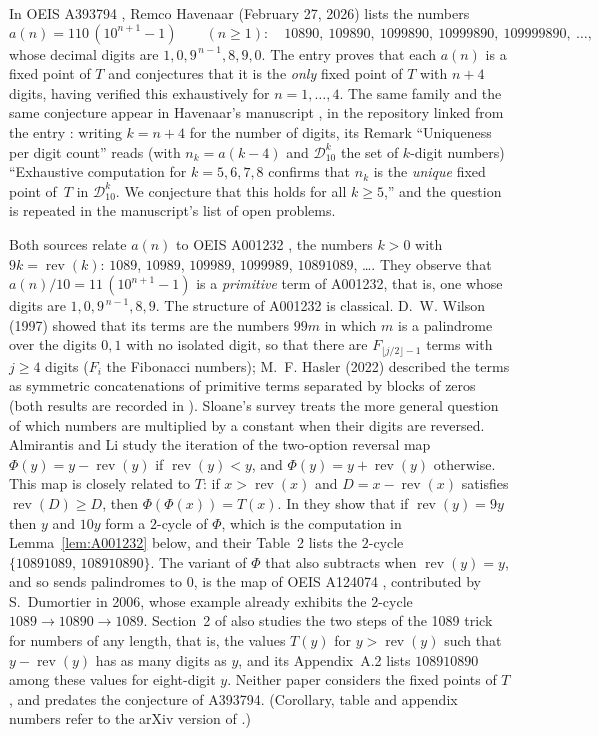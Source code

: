 \documentclass[11pt]{amsart}
\theoremstyle{plain}
\theoremstyle{definition}
\DeclareMathOperator{\rev}{rev}
\begin{document}
In OEIS A393794 \cite{A393794}, Remco Havenaar (February 27, 2026) lists the numbers
\[
  a(n)=110\,(10^{n+1}-1)\qquad(n\ge1):\quad 10890,\ 109890,\ 1099890,\ 10999890,\ 109999890,\ \dots,
\]
whose decimal digits are $1,0,9^{\,n-1},8,9,0$. The entry proves that each $a(n)$ is a fixed point of $T$ and conjectures that it is the \emph{only} fixed point of $T$ with $n+4$ digits, having verified this exhaustively for $n=1,\dots,4$.
The same family and the same conjecture appear in Havenaar's manuscript \cite{HavenaarPaper}, in the repository linked from the entry \cite{HavenaarRepo}: writing $k=n+4$ for the number of digits, its Remark ``Uniqueness per digit count'' reads (with $n_k=a(k-4)$ and $\mathcal{D}_{10}^k$ the set of $k$-digit numbers) ``Exhaustive computation for $k = 5, 6, 7, 8$ confirms that $n_k$ is the \emph{unique} fixed point of~$T$ in $\mathcal{D}_{10}^k$. We conjecture that this holds for all $k \geq 5$,'' and the question is repeated in the manuscript's list of open problems.

Both sources relate $a(n)$ to OEIS A001232 \cite{A001232}, the numbers $k>0$ with $9k=\rev(k)$: $1089$, $10989$, $109989$, $1099989$, $10891089$, \dots. They observe that $a(n)/10=11\,(10^{n+1}-1)$ is a \emph{primitive} term of A001232, that is, one whose digits are $1,0,9^{\,n-1},8,9$. The structure of A001232 is classical. D.~W. Wilson (1997) showed that its terms are the numbers $99m$ in which $m$ is a palindrome over the digits $0,1$ with no isolated digit, so that there are $F_{\lfloor j/2\rfloor-1}$ terms with $j\ge4$ digits ($F_i$ the Fibonacci numbers); M.~F. Hasler (2022) described the terms as symmetric concatenations of primitive terms separated by blocks of zeros (both results are recorded in \cite{A001232}). Sloane's survey \cite{Sloane2178} treats the more general question of which numbers are multiplied by a constant when their digits are reversed.
Almirantis and Li \cite{AL1,AL2} study the iteration of the two-option reversal map $\Phi(y)=y-\rev(y)$ if $\rev(y)<y$, and $\Phi(y)=y+\rev(y)$ otherwise. This map is closely related to $T$: if $x>\rev(x)$ and $D=x-\rev(x)$ satisfies $\rev(D)\ge D$, then $\Phi(\Phi(x))=T(x)$. In \cite[Corollary~3.3]{AL2} they show that if $\rev(y)=9y$ then $y$ and $10y$ form a $2$-cycle of $\Phi$, which is the computation in Lemma~\ref{lem:A001232} below, and their Table~2 lists the $2$-cycle $\{10891089,\,108910890\}$. The variant of $\Phi$ that also subtracts when $\rev(y)=y$, and so sends palindromes to $0$, is the map of OEIS A124074 \cite{A124074}, contributed by S.~Dumortier in 2006, whose example already exhibits the $2$-cycle $1089\to10890\to1089$. Section~2 of \cite{AL2} also studies the two steps of the 1089 trick for numbers of any length, that is, the values $T(y)$ for $y>\rev(y)$ such that $y-\rev(y)$ has as many digits as $y$, and its Appendix~A.2 lists $108910890$ among these values for eight-digit $y$. Neither paper considers the fixed points of $T$, and \cite{AL2} predates the conjecture of A393794. (Corollary, table and appendix numbers refer to the arXiv version of \cite{AL2}.)
\end{document}
